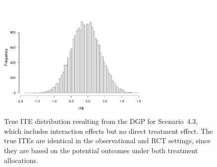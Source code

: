 % 


\begin{figure}[htbp]
\centering
\includegraphics[width=0.7\textwidth]{img/results/observ_scenario3_ite_distribution_dgp.png}
\caption{True ITE distribution resulting from the DGP for Scenario~4.3, which includes interaction effects but no direct treatment effect. The true ITEs are identical in the observational and RCT settings, since they are based on the potential outcomes under both treatment allocations.}
\label{fig:scenario3_ite_distribution_dgp}
\end{figure}



